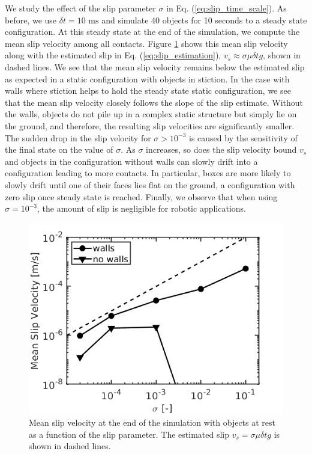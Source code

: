 We study the effect of the slip parameter $\sigma$ in Eq.
(\ref{eq:slip_time_scale}). As before, we use $\delta t = 10\text{ ms}$ and
simulate 40 objects for 10 seconds to a steady state configuration. At this
steady state at the end of the simulation, we compute the mean slip velocity
among all contacts. Figure \ref{fig:clutter_sigma_vt} shows this mean slip
velocity along with the estimated slip in Eq. (\ref{eq:slip_estimation}), $v_s
\approx\sigma\mu\delta t g$, shown in dashed lines. We see that the mean slip
velocity remains below the estimated slip as expected in a static configuration
with objects in stiction. In the case with walls where stiction helps to hold
the steady state static configuration, we see that the mean slip velocity
closely follows the slope of the slip estimate. Without the walls, objects do
not pile up in a complex static structure but simply lie on the ground, and
therefore, the resulting slip velocities are significantly smaller. The sudden
drop in the slip velocity for $\sigma>10^{-3}$ is caused by the sensitivity of
the final state on the value of $\sigma$. As $\sigma$ increases, so does the
slip velocity bound $v_s$ and objects in the configuration without walls can
slowly drift into a configuration leading to more contacts. In particular, boxes
are more likely to slowly drift until one of their faces lies flat
on the ground, a configuration with zero slip once steady state is reached.
Finally, we observe that when using $\sigma=10^{-3}$, the amount of slip is
negligible for robotic applications.
\begin{figure}[!h]
	\centering
	\includegraphics[width=0.6\columnwidth]{figures/clutter/sigma_vt.png}
	\caption{\label{fig:clutter_sigma_vt} 
	Mean slip velocity at the end of the simulation with objects at rest as a
	function of the slip parameter. The estimated slip $v_s = \sigma\mu\delta t g$ is shown in dashed lines.}
\end{figure}

